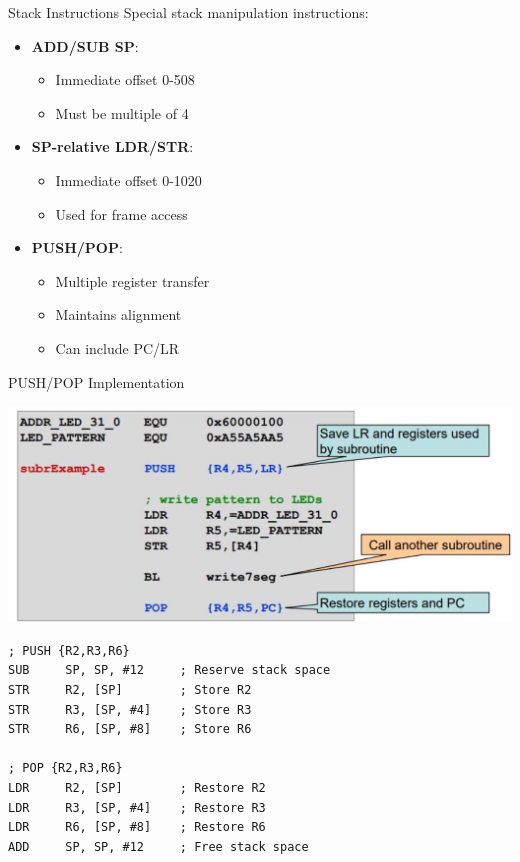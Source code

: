 \begin{concept}{Stack Instructions}
Special stack manipulation instructions:
\vspace{1mm}\\
\begin{minipage}[t]{0.5\linewidth}
\begin{itemize}
  \item \textbf{ADD/SUB SP}:
    \begin{itemize}
      \item Immediate offset 0-508
      \item Must be multiple of 4
    \end{itemize}
  \item \textbf{SP-relative LDR/STR}:
    \begin{itemize}
      \item Immediate offset 0-1020
      \item Used for frame access
    \end{itemize}
\end{itemize}
\end{minipage}
\begin{minipage}[t]{0.5\linewidth}
\begin{itemize}
  \item \textbf{PUSH/POP}:
    \begin{itemize}
      \item Multiple register transfer
      \item Maintains alignment
      \item Can include PC/LR
    \end{itemize}
\end{itemize}
\end{minipage}
\end{concept}



\begin{example2}{PUSH/POP Implementation}

  \includegraphics[width=\linewidth]{images/2024_12_29_79e6b22f503fb7b4f718g-08}
\begin{lstlisting}[language=armasm, style=basesmol]
; PUSH {R2,R3,R6}
SUB     SP, SP, #12     ; Reserve stack space
STR     R2, [SP]        ; Store R2
STR     R3, [SP, #4]    ; Store R3
STR     R6, [SP, #8]    ; Store R6

; POP {R2,R3,R6}
LDR     R2, [SP]        ; Restore R2
LDR     R3, [SP, #4]    ; Restore R3
LDR     R6, [SP, #8]    ; Restore R6
ADD     SP, SP, #12     ; Free stack space
\end{lstlisting}
\end{example2}

